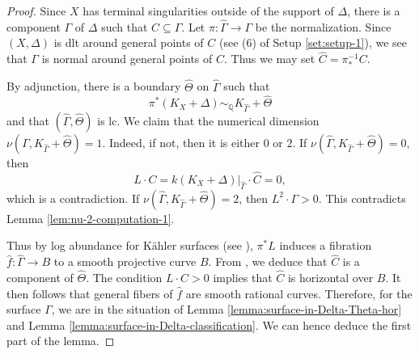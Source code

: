 \documentclass[12pt]{amsart}
\newcommand{\<}{\leq}
\newcommand{\D}{\Delta}
\theoremstyle{remark}
\theoremstyle{definition}
\theoremstyle{definition}
\numberwithin{equation}{section}
\theoremstyle{definition}
\theoremstyle{definition}
\begin{document}
\begin{proof}
Since $X$ has terminal singularities outside of the support of $\Delta$, 
 there is a component $\Gamma$ of $\Delta$ such that $C \subseteq \Gamma$. 
Let $\pi \colon \widehat{\Gamma} \to \Gamma$ be the normalization.
Since $(X,\D)$ is dlt around  general points of $C$ (see (6) of Setup \ref{set:setup-1}), we see that $\Gamma$ is normal around general points of $C$. 
Thus we may set $\widehat{C} = \pi^{-1}_*C$. 

By adjunction, there is a boundary $\widehat{\Theta}$ on $\widehat{\Gamma}$ such that 
\[\pi^* (K_X+\Delta)  \sim_{\mathbb{Q}} K_{\widehat{\Gamma}} + \widehat{\Theta}\] 
and that $(\widehat{\Gamma}, \widehat{\Theta})$ is lc. 
We claim that the numerical dimension $\nu(\Gamma, K_{\widehat \Gamma}+\widehat{\Theta})=1$. 
Indeed, if not, then it is either $0$ or $2$. 
If $\nu(\widehat{\Gamma}, K_{\widehat \Gamma}+\widehat{\Theta})=0$, then 
\[ L\cdot C=k(K_X+\Delta)|_{\widehat \Gamma}\cdot\widehat C=0,\]  which is a contradiction. 
If $\nu(\widehat{\Gamma}, K_{\widehat \Gamma}+\widehat{\Theta})=2$, then $L^2\cdot \Gamma>0$. 
This contradicts Lemma \ref{lem:nu-2-computation-1}. 

Thus by log abundance for K\"ahler surfaces (see \cite[Theorem 6.3]{DasOu2022}), $\pi^*L$ induces a fibration $\hat{f}\colon \widehat{\Gamma} \to B$ to a smooth projective curve $B$. 
From \cite[Proposition 16.6]{Kol92}, we deduce that $\widehat{C}$ is a component of $\widehat{\Theta}$. 
The condition $L\cdot C >0$ implies that $\widehat{C}$ is horizontal over $B$. 
It then follows that general fibers of $\hat{f}$ are smooth rational curves. 
Therefore, for the surface $\Gamma$, we are in the situation of Lemma \ref{lemma:surface-in-Delta-Theta-hor} and Lemma \ref{lemma:surface-in-Delta-classification}.  
We can hence deduce the first part of the lemma. 



\end{proof}
\end{document}
